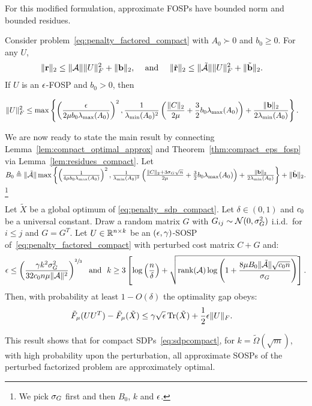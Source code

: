 For this modified formulation, approximate FOSPs have bounded norm and bounded residues.
\begin{lemma}\label{lem:residues_compact}
	Consider problem~\eqref{eq:penalty_factored_compact} with $A_0 \succ 0$ and $b_0 \geq 0$. For any $U$,
	\begin{align*}
		\|\mathbf{r}\|_2 & \leq \|\mathcal{A}\| \|U\|_F^2 + \|\mathbf{b}\|_2, & \textrm{ and } & & \|\tilde {\mathbf{r}}\|_2 & \leq \|\tilde {\mathcal{A}}\| \|U\|_F^2 + \|\tilde {\mathbf{b}}\|_2.
	\end{align*}
	If $U$ is an $\epsilon$-FOSP and $b_0 > 0$, then
	\begin{small}
	\begin{align*}
		\|U\|_F^2 & \leq \max\left\{ \left(\frac{\epsilon}{2\mu b_0 \lambda_{\max}(A_0)}\right)^2, \frac{1}{\lambda_{\min}(A_0)^2} \left(\frac{\|C\|_2}{2\mu} + \frac{3}{2}b_0 \lambda_{\max}(A_0)\right) + \frac{\|\mathbf{b}\|_2}{2\lambda_{\min}(A_0)} \right\}.
	\end{align*}\end{small}
\end{lemma}

We are now ready to state the main result by connecting Lemma~\ref{lem:compact_optimal_approx} and Theorem~\ref{thm:compact_eps_fosp} via Lemma~\ref{lem:residues_compact}. Let $ B_0 \triangleq \|\tilde {\mathcal{A}}\| \max\left\{ \left(\frac{1}{4\mu b_0 \lambda_{\max}(A_0)}\right)^2, \frac{1}{\lambda_{\min}(A_0)^2} \left(\frac{\|C\|_2 + 3\sigma_G\sqrt{n}}{2\mu} + \frac{3}{2}b_0 \lambda_{\max}(A_0)\right) + \frac{\|\mathbf{b}\|_2}{2\lambda_{\min}(A_0)} \right\} + \|\tilde {\mathbf{b}}\|_2.$\footnote{We pick $\sigma_G$ first and then  $B_0$, $k$ and $\epsilon$.} 
\begin{theorem}\label{thm:optimal_approx_compact} Let $\tilde X$ be a global optimum of \eqref{eq:penalty_sdp_compact}. Let $\delta \in (0, 1)$ and $c_0$ be a universal constant. Draw a random matrix $G$ with $G_{ij} \sim \mathcal{N}(0, \sigma_G^2)$ i.i.d.\ for $i \leq j$ and $G = G^T$. Let $U \in \mathbb{R}^{n\times k}$ be an $(\epsilon, \gamma)$-SOSP of~\eqref{eq:penalty_factored_compact} with perturbed cost matrix $C+G$ and:
\begin{align*}
	\epsilon \leq \left(\frac{\gamma k^2 \sigma_G^2 }{ 32c_0 n  \mu \|\mathcal{A}\|^2}\right)^{\sfrac{2}{3}} ~\text{ and }~k \geq 3\left[\log\left(\frac{n}{\delta}\right) + \sqrt{ \operatorname{rank}(\mathcal{A})   \log\left( 1 + \frac{8 \mu B_0 \|\tilde {\mathcal{A}}\| \sqrt{c_0  n}}{\sigma_G } \right) }  \right].
\end{align*}
Then, with probability at least $1-O(\delta)$ the optimality gap obeys:
\begin{align}\label{eq:main_thm_compact}
	\tilde F_\mu(UU^T) - \tilde F_\mu(\tilde X) & \leq \gamma \sqrt{\epsilon} \operatorname{Tr}(\tilde X) + \frac{1}{2}\epsilon \|U\|_F.
\end{align}
\end{theorem}
%
This result shows that for compact SDPs~\eqref{eq:sdpcompact}, for $k =\tilde{\Omega}(\sqrt{m})$, with high probability upon the perturbation, all approximate SOSPs of the perturbed factorized problem are approximately optimal.

